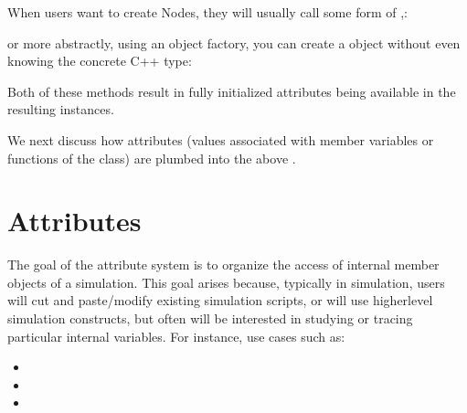 \documentclass[letterpaper,10pt,english]{sphinxmanual}
\renewcommand{\sphinxcode}[1]{\texttt{\small{#1}}}
\begin{document}
When users want to create Nodes, they will usually call some form of
\sphinxcode{},:

\begin{sphinxVerbatim}[commandchars=\\\{\}]
    
\end{sphinxVerbatim}

or more abstractly, using an object factory, you can create a
\sphinxcode{} object without even knowing the concrete C++ type:

\begin{sphinxVerbatim}[commandchars=\\\{\}]
 
    
 
     
\end{sphinxVerbatim}

Both of these methods result in fully initialized attributes being available
in the resulting \sphinxcode{} instances.

We next discuss how attributes (values associated with member variables or
functions of the class) are plumbed into the above \sphinxcode{}.


\section{Attributes}
\label{\detokenize{attributes:id1}}
The goal of the attribute system is to organize the access of
internal member objects of a simulation. This goal arises because,
typically in simulation, users will cut and paste/modify existing
simulation scripts, or will use higher\sphinxhyphen{}level simulation constructs,
but often will be interested in studying or tracing particular
internal variables.  For instance, use cases such as:
\begin{itemize}
\item {} 

\item {} 

\item {} 

\end{itemize}
\end{document}

